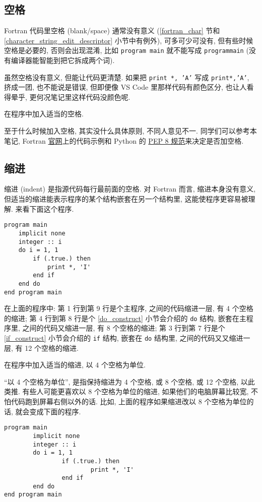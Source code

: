 \subsection{空格}

Fortran 代码里空格 (blank/space) 通常没有意义 (\ref{fortran_char} 节和 \ref{character_string_edit_descriptor} 小节中有例外), 可多可少可没有, 但有些时候空格是必要的, 否则会出现混淆, 比如 \texttt{program main} 就不能写成 \texttt{programmain} (没有编译器能智能到把它拆成两个词).

虽然空格没有意义, 但能让代码更清楚. 如果把 \texttt{print *, 'A'} 写成 \texttt{print*,'A'}, 挤成一团, 也不能说是错误, 但即便像 VS Code 里那样代码有颜色区分, 也让人看得晕乎, 更何况笔记里这样代码没颜色呢.
\begin{convention}
    在程序中加入适当的空格.\label{fortran_blank}
\end{convention}
至于什么时候加入空格, 其实没什么具体原则, 不同人意见不一. 同学们可以参考本笔记,  Fortran \href{https://fortran-lang.org/}{官网}上的代码示例和 Python 的 \href{https://peps.python.org/pep-0008/}{PEP 8 规范}来决定是否加空格.

\subsection{缩进}\label{indent}

缩进 (indent) 是指源代码每行最前面的空格. 对 Fortran 而言, 缩进本身没有意义, 但适当的缩进能表示程序的某个结构嵌套在另一个结构里, 这能使程序更容易被理解. 来看下面这个程序.
\begin{lstlisting}
program main
    implicit none
    integer :: i
    do i = 1, 1
        if (.true.) then
            print *, 'I'
        end if
    end do
end program main
\end{lstlisting}
在上面的程序中: 第 1 行到第 9 行是个主程序, 之间的代码缩进一层, 有 4 个空格的缩进; 第 4 行到第 8 行是个 \ref{do_construct} 小节会介绍的 \texttt{do} 结构, 嵌套在主程序里, 之间的代码又缩进一层, 有 8 个空格的缩进; 第 3 行到第 7 行是个 \ref{if_construct} 小节会介绍的 \texttt{if} 结构, 嵌套在 \texttt{do} 结构里, 之间的代码又又缩进一层, 有 12 个空格的缩进.
\begin{convention}
    在程序中加入适当的缩进, 以 $4$ 个空格为单位.\label{fortran_indent}
\end{convention}
``以 4 个空格为单位'', 是指保持缩进为 4 个空格, 或 8 个空格, 或 12 个空格, 以此类推. 有些人可能更喜欢以 8 个空格为单位的缩进, 如果他们的电脑屏幕比较宽, 不怕代码跑到屏幕右侧以外的话. 比如, 上面的程序如果缩进改以 8 个空格为单位的话, 就会变成下面的程序.
\begin{lstlisting}
program main
        implicit none
        integer :: i
        do i = 1, 1
                if (.true.) then
                        print *, 'I'
                end if
        end do
end program main
\end{lstlisting}

